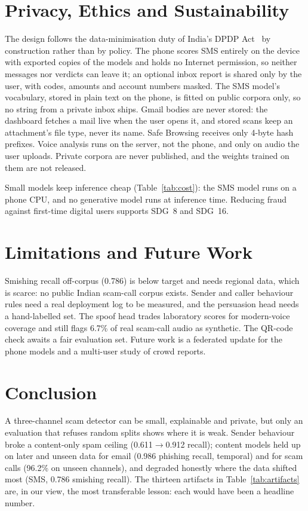 \documentclass[conference]{IEEEtran}
\begin{document}
\section{Privacy, Ethics and Sustainability}\label{sec:ethics}
The design follows the data-minimisation duty of India's DPDP
Act~\cite{dpdp2023} by construction rather than by policy. The phone scores
SMS entirely on the device with exported copies of the models and holds no
Internet permission, so neither messages nor verdicts can leave it; an optional
inbox report is shared only by the user, with codes, amounts and account
numbers masked. The SMS model's vocabulary, stored in plain text on the phone,
is fitted on public corpora only, so no string from a private inbox ships. Gmail bodies are never stored:
the dashboard fetches a mail live when the user opens it, and stored scans keep
an attachment's file type, never its name. Safe Browsing receives only 4-byte
hash prefixes. Voice analysis runs on the server, not the phone, and only on audio
the user uploads. Private corpora are never published, and the weights trained on
them are not released.

Small models keep inference cheap (Table~\ref{tab:cost}): the SMS model
runs on a phone CPU, and no generative model runs at inference time. Reducing
fraud against first-time digital users supports SDG~8 and SDG~16.

\section{Limitations and Future Work}
Smishing recall off-corpus (0.786) is below target and needs regional data,
which is scarce: no public Indian scam-call corpus exists. Sender and caller
behaviour rules need a real deployment log to be measured, and the persuasion
head needs a hand-labelled set. The spoof head trades laboratory scores for
modern-voice coverage and still flags 6.7\% of real scam-call audio as
synthetic. The QR-code check awaits a fair evaluation set. Future work is a
federated update for the phone models and a multi-user study of crowd reports.

\section{Conclusion}
A three-channel scam detector can be small, explainable and private, but only
an evaluation that refuses random splits shows where it is weak. Sender
behaviour broke a content-only spam ceiling (0.611$\to$0.912 recall); content
models held up on later and unseen data for email (0.986 phishing recall,
temporal) and for scam calls (96.2\% on unseen channels), and degraded
honestly where the data shifted most (SMS, 0.786 smishing recall). The thirteen
artifacts in Table~\ref{tab:artifacts} are, in our view, the most transferable
lesson: each would have been a headline number.
\end{document}
